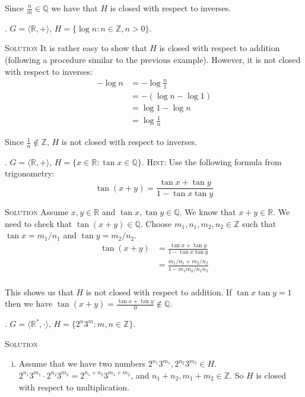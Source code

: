 \documentclass[twoside]{amsart}
\newcommand{\solution}{\textsc{Solution}\xspace}
\begin{document}
\begin{enumerate}[A.]
\begin{enumerate}[(i)]
      Since $\displaystyle \frac{n}{m} \in \mathbb{Q}$ we have that 
      $H$ is closed with respect to inverses.
   \end{enumerate}

   . $G = \langle \mathbb{R}, + \rangle,\, H = 
   \{ \log n : n \in \mathbb{Z}, n > 0\}$.

   \noindent \solution It is rather easy to show that $H$ is closed
   with respect to addition (following a procedure similar to the
   previous example). However, it is not closed with respect to
   inverses:
      \begin{align*}
         - \log n & = - \log \frac{n}{1} \\
	          & = - (\log n - \log 1) \\
		  & = \log 1 - \log n \\
		  & = \log \frac{1}{n}
      \end{align*}

   Since $\displaystyle \frac{1}{n} \not \in \mathbb{Z}$, $H$ is
   not closed with respect to inverses.

   . $G = \langle \mathbb{R},+ \rangle,\, H = 
   \{ x \in \mathbb{R} : \tan x \in \mathbb{Q}\}$. \textsc{Hint}:
   Use the following formula from trigonometry:
   \[
      \tan (x+y) = \frac {\tan x + \tan y}{1 - \tan x \tan y}
   \]

   \noindent \solution Assume $x,y \in \mathbb{R}$ and $\tan x,
   \tan y \in \mathbb{Q}$. We know that $x+y \in \mathbb{R}$.
   We need to check that $\tan (x+y) \in \mathbb{Q}$. Choose 
   $m_1,n_1,m_2,n_2 \in \mathbb{Z}$ such that $\tan x = m_1/n_1$
   and $\tan y = m_2/n_2$.
   \begin{align*}
      \tan (x + y) & = \frac {\tan x + \tan y}{1 - \tan x \tan y}\\
                   & = \frac {m_1/n_1 + m_2/n_2}{1 - m_1m_2/n_1n_2} \\
   \end{align*}

   This shows us that $H$ is not closed with respect to addition. If
   $\tan x \tan y = 1$ then we have $\displaystyle \tan (x+y) =
   \frac{\tan x + \tan y}{0} \not \in \mathbb{Q}$.

   . $G = \langle \mathbb{R}^*,\cdot \rangle,\, H =
   \{2^n3^m : m,n \in \mathbb{Z}\}$.   
   
   \noindent \solution 
   \begin{enumerate}[(i)]
      \item Assume that we have two numbers $2^{n_1}3^{m_1}, 2^{n_2}3^{m_2} \in
      H$.  $2^{n_1}3^{m_1}\cdot 2^{n_2}3^{m_2} = 2^{n_1+n_2}3^{m_1+m_2}$, and
      $n_1+n_2,m_1+m_2 \in \mathbb{Z}$. So $H$ is closed with respect to
      multiplication.


\end{enumerate}
\end{enumerate}
\end{document}
